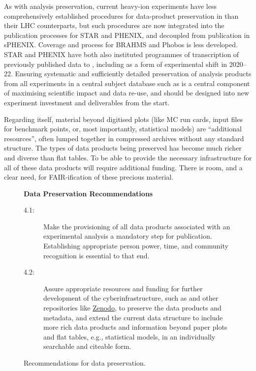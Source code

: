 \documentclass[11pt]{article}
\begin{document}
As with \gls{analysis preservation}, current heavy-ion experiments have less comprehensively established procedures for data-product preservation in \hepdata than their \gls{LHC} counterparts, but such procedures are now integrated into the publication processes for \gls{STAR} and \gls{PHENIX}, and decoupled from publication in \gls{sPHENIX}. Coverage and process for BRAHMS and Phobos is less developed. \gls{STAR} and \gls{PHENIX} have both also instituted programmes of transcription of previously published data to \hepdata, including as a form of experimental shift in 2020--22. Ensuring systematic and sufficiently detailed preservation of analysis products from all experiments in a central subject database such as \hepdata is a central component of maximising scientific impact and data re-use, and should be designed into new experiment investment and deliverables from the start. 

Regarding \hepdata itself, material beyond digitised plots (like MC run cards, input files for benchmark points, or, most importantly, statistical models) are ``additional resources'', often lumped together in compressed archives without any standard structure.
The types of data products being preserved has become much richer and diverse than flat tables.
To be able to provide the necessary infrastructure for all of these data products will require additional funding.
There is room, and a clear need, for \gls{FAIR}-ification of these precious material.

\begin{figure}[!ht]
\begin{tcolorbox}
\begin{center}
{\large \textbf{Data Preservation Recommendations}}
\end{center}
%
\begin{description}
   \item[4.1:] Make the provisioning of all \glspl{data product} associated with an experimental analysis a mandatory step for publication.
   Establishing appropriate person power, time, and community recognition is essential to that end.
   \item[4.2:] Assure appropriate resources and funding for further development of the cyberinfrastructure, such as \href{https://www.hepdata.net/}{\hepdata} and other repositories like \href{https://zenodo.org}{Zenodo}, to preserve the data products and metadata, and extend the current data structure to include more rich data products and information beyond paper plots and flat tables, e.g., statistical models, in an individually searchable and citeable form.
\end{description}
\end{tcolorbox}
\caption{Recommendations for data preservation.}
\label{fig:recs_datapreservation}
\end{figure}
\end{document}
